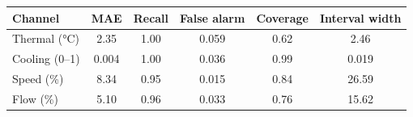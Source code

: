 \begin{tabular}{lccccc}
\toprule
Channel & MAE & Recall & False alarm & Coverage & Interval width \\
\midrule
Thermal (\si{\celsius}) & 2.35 & 1.00 & 0.059 & 0.62 & 2.46 \\
Cooling (0--1) & 0.004 & 1.00 & 0.036 & 0.99 & 0.019 \\
Speed (\%) & 8.34 & 0.95 & 0.015 & 0.84 & 26.59 \\
Flow (\%) & 5.10 & 0.96 & 0.033 & 0.76 & 15.62 \\
\bottomrule
\end{tabular}
